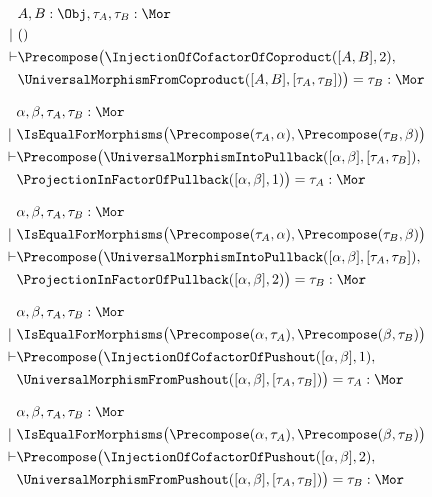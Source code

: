 \begin{sequent}
\begin{align*}
  &A, B:\Obj, \tau_A, \tau_B:\Mor \\
  |~ &()\\
  \vdash &\Precompose\big(\InjectionOfCofactorOfCoproduct( [A, B], 2 ),\\
  &\UniversalMorphismFromCoproduct( [A,B], [\tau_A, \tau_B] ) \big) = \tau_B:\Mor
\end{align*}
\end{sequent}


\begin{sequent}
\begin{align*}
  &\alpha, \beta, \tau_A, \tau_B:\Mor \\
  |~ &\IsEqualForMorphisms\big( \Precompose( \tau_A, \alpha ), \Precompose( \tau_B, \beta ) \big)\\
  \vdash &\Precompose\big( \UniversalMorphismIntoPullback( [\alpha, \beta], [\tau_A, \tau_B] ), \\
  &\ProjectionInFactorOfPullback( [\alpha, \beta], 1 ) \big) = \tau_A: \Mor
\end{align*}
\end{sequent}

\begin{sequent}
\begin{align*}
  &\alpha, \beta, \tau_A, \tau_B:\Mor \\
  |~ &\IsEqualForMorphisms\big( \Precompose( \tau_A, \alpha ), \Precompose( \tau_B, \beta ) \big)\\
  \vdash &\Precompose\big( \UniversalMorphismIntoPullback( [\alpha, \beta], [\tau_A, \tau_B] ), \\
  &\ProjectionInFactorOfPullback( [\alpha, \beta], 2 ) \big) = \tau_B: \Mor
\end{align*}
\end{sequent}

\begin{sequent}
\begin{align*}
  &\alpha, \beta, \tau_A, \tau_B:\Mor \\
  |~ &\IsEqualForMorphisms\big( \Precompose( \alpha, \tau_A ), \Precompose( \beta, \tau_B) \big)\\
  \vdash &\Precompose\big( \InjectionOfCofactorOfPushout( [\alpha, \beta], 1 ), \\
  &\UniversalMorphismFromPushout( [\alpha, \beta], [\tau_A, \tau_B] )\big) = \tau_A: \Mor
\end{align*}
\end{sequent}

\begin{sequent}
\begin{align*}
  &\alpha, \beta, \tau_A, \tau_B:\Mor \\
  |~ &\IsEqualForMorphisms\big( \Precompose( \alpha, \tau_A ), \Precompose( \beta, \tau_B) \big)\\
  \vdash &\Precompose\big( \InjectionOfCofactorOfPushout( [\alpha, \beta], 2 ), \\
  &\UniversalMorphismFromPushout( [\alpha, \beta], [\tau_A, \tau_B] )\big) = \tau_B: \Mor
\end{align*}
\end{sequent}
